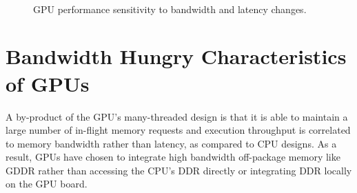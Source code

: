 \begin{figure}[t]
    \centering
    \\
    \caption{GPU performance sensitivity to bandwidth and latency changes.}
    \label{fig:bwlatencysensitivity}
\end{figure}

\section{Bandwidth Hungry Characteristics of GPUs}
\label{heterogeneous_background}
A by-product of the GPU's many-threaded design is that it is able to maintain a
large number of in-flight memory requests and execution throughput is correlated
to memory bandwidth rather than latency, as compared to CPU designs.  As a
result, GPUs have chosen to integrate high bandwidth off-package memory like
GDDR rather than accessing the CPU's DDR directly or integrating DDR locally on
the GPU board. 

